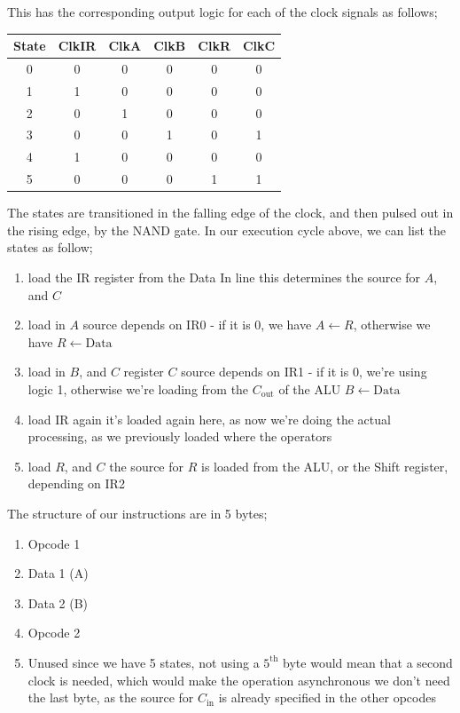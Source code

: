 \documentclass[a4paper, 12pt]{article}
\begin{document}
            This has the corresponding output logic for each of the clock signals as follows;
            \begin{center}
                \begin{tabular}{c||c|c|c|c|c}
                    State & ClkIR & ClkA & ClkB & ClkR & ClkC \\
                    \hline
                    0 & 0 & 0 & 0 & 0 & 0 \\
                    1 & 1 & 0 & 0 & 0 & 0 \\
                    2 & 0 & 1 & 0 & 0 & 0 \\
                    3 & 0 & 0 & 1 & 0 & 1 \\
                    4 & 1 & 0 & 0 & 0 & 0 \\
                    5 & 0 & 0 & 0 & 1 & 1
                \end{tabular}
            \end{center}
            The states are transitioned in the falling edge of the clock, and then pulsed out in the rising edge, by the NAND gate. In our execution cycle above, we can list the states as follow;
            \begin{enumerate}[1.]
                \itemsep0em
                \item load the IR register from the Data In line
                    \subitem this determines the source for $A$, and $C$
                \item load in $A$
                    \subitem source depends on IR0 - if it is 0, we have $A \leftarrow R$, otherwise we have $R \leftarrow \text{Data}$
                \item load in $B$, and $C$ register
                    \subitem $C$ source depends on IR1 - if it is 0, we're using logic 1, otherwise we're loading from the $C_\text{out}$ of the ALU
                    \subitem $B \leftarrow \text{Data}$
                \item load IR again
                    \subitem it's loaded again here, as now we're doing the actual processing, as we previously loaded where the operators
                \item load $R$, and $C$
                    \subitem the source for $R$ is loaded from the ALU, or the Shift register, depending on IR2
            \end{enumerate}
            The structure of our instructions are in 5 bytes;
            \begin{enumerate}[1.]
                \itemsep0em
                \item Opcode 1
                \item Data 1 (A)
                \item Data 2 (B)
                \item Opcode 2
                \item Unused
                    \subitem since we have 5 states, not using a $5^\text{th}$ byte would mean that a second clock is needed, which would make the operation asynchronous
                    \subitem we don't need the last byte, as the source for $C_\text{in}$ is already specified in the other opcodes
            \end{enumerate}
\end{document}
